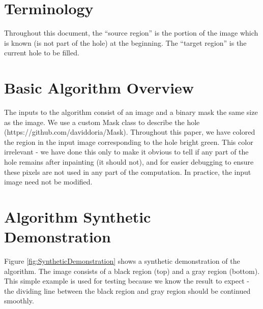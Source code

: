 \documentclass{InsightArticle}
\begin{document}
\section{Terminology}
Throughout this document, the ``source region'' is the portion of the image which is known (is not part of the hole) at the beginning. The ``target region'' is the current hole to be filled.

\section{Basic Algorithm Overview}
The inputs to the algorithm consist of an image and a binary mask the same size as the image. We use a custom Mask class to describe the hole (https://github.com/daviddoria/Mask). Throughout this paper, we have colored the region in the input image corresponding to the hole bright green. This color irrelevant - we have done this only to make it obvious to tell if any part of the hole remains after inpainting (it should not), and for easier debugging to ensure these pixels are not used in any part of the computation. In practice, the input image need not be modified.

\section{Algorithm Synthetic Demonstration}
Figure \ref{fig:SyntheticDemonstration} shows a synthetic demonstration of the algorithm. The image consists of a black region (top) and a gray region (bottom).  This simple example is used for testing because we know the result to expect - the dividing line between the black region and gray region should be continued smoothly.
\end{document}
